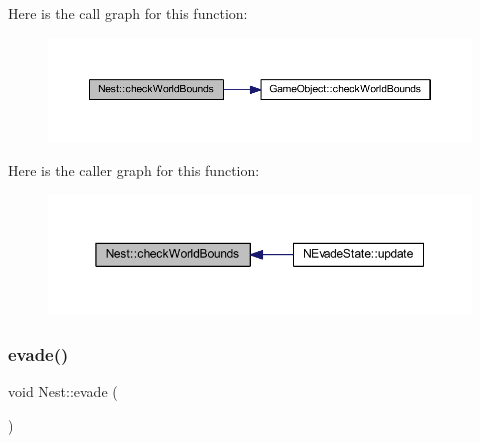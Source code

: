 Here is the call graph for this function\+:
\nopagebreak
\begin{figure}[H]
\begin{center}
\leavevmode
\includegraphics[width=350pt]{class_nest_ab62ba42fc4c7e4c043f29e59ab8c8ea3_cgraph}
\end{center}
\end{figure}
Here is the caller graph for this function\+:
\nopagebreak
\begin{figure}[H]
\begin{center}
\leavevmode
\includegraphics[width=350pt]{class_nest_ab62ba42fc4c7e4c043f29e59ab8c8ea3_icgraph}
\end{center}
\end{figure}
\mbox{\label{class_nest_ad5b9ccc37ae3a0d503c524f808a8fd1c}} 
\subsubsection{\texorpdfstring{evade()}{evade()}}
{\footnotesize\ttfamily void Nest\+::evade (\begin{DoxyParamCaption}{ }\end{DoxyParamCaption})}


